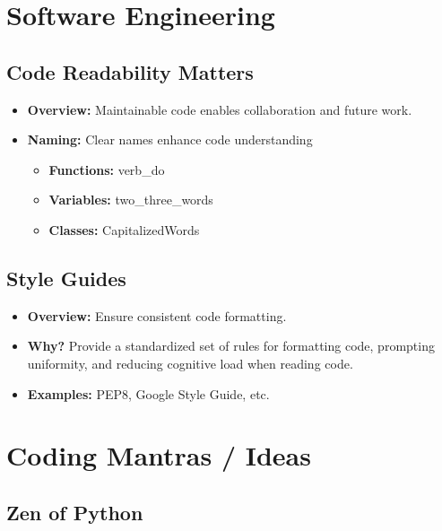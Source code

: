 \section{Software Engineering}

\subsection{Code Readability Matters}
\begin{notes}
    \begin{itemize}
        \item \textbf{Overview:} Maintainable code enables collaboration and future work.
        \item \textbf{Naming:} Clear names enhance code understanding 
        \begin{itemize}
            \item \textbf{Functions:} verb\_do
            \item \textbf{Variables:} two\_three\_words
            \item \textbf{Classes:} CapitalizedWords
        \end{itemize}
    \end{itemize}
\end{notes}

\subsection{Style Guides}
\begin{notes}
    \begin{itemize}
        \item \textbf{Overview:} Ensure consistent code formatting. 
        \item \textbf{Why?} Provide a standardized set of rules for formatting code, prompting uniformity, and reducing cognitive load when reading code. 
        \item \textbf{Examples:} PEP8, Google Style Guide, etc.
    \end{itemize}
\end{notes}
\newpage

\section{Coding Mantras / Ideas}
\subsection{Zen of Python}
\begin{definition}
\end{definition}


